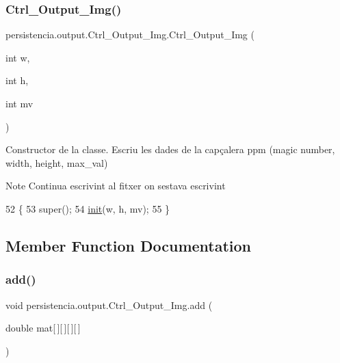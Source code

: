 \subsubsection{\texorpdfstring{Ctrl\+\_\+\+Output\+\_\+\+Img()}{Ctrl\_Output\_Img()}\hspace{0.1cm}{\footnotesize\ttfamily [2/2]}}
{\footnotesize\ttfamily persistencia.\+output.\+Ctrl\+\_\+\+Output\+\_\+\+Img.\+Ctrl\+\_\+\+Output\+\_\+\+Img (\begin{DoxyParamCaption}\item[{int}]{w,  }\item[{int}]{h,  }\item[{int}]{mv }\end{DoxyParamCaption})\hspace{0.3cm}{\ttfamily [inline]}}



Constructor de la classe. Escriu les dades de la capçalera ppm (magic number, width, height, max\+\_\+val) 

\begin{DoxyNote}{Note}
Continua escrivint al fitxer on s\textquotesingle{}estava escrivint 
\end{DoxyNote}

\begin{DoxyCode}
52                                                  \{
53         super();
54         \hyperlink{classpersistencia_1_1output_1_1Ctrl__Output__Img_aab3258280bd6abb81d580c93eb68fb28}{init}(w, h, mv);        
55     \}
\end{DoxyCode}


\subsection{Member Function Documentation}
\mbox{\label{classpersistencia_1_1output_1_1Ctrl__Output__Img_a305a977f4d4b999cf65e14e7106b6c5e}} 
\subsubsection{\texorpdfstring{add()}{add()}}
{\footnotesize\ttfamily void persistencia.\+output.\+Ctrl\+\_\+\+Output\+\_\+\+Img.\+add (\begin{DoxyParamCaption}\item[{double}]{mat\mbox{[}$\,$\mbox{]}\mbox{[}$\,$\mbox{]}\mbox{[}$\,$\mbox{]}\mbox{[}$\,$\mbox{]} }\end{DoxyParamCaption})\hspace{0.3cm}{\ttfamily [inline]}}


